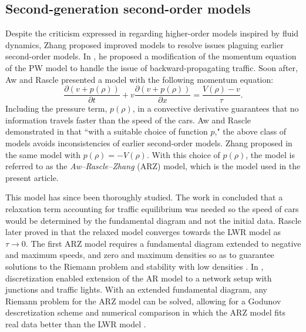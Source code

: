 \documentclass[preprint]{elsarticle}
\begin{document}
\subsection{Second-generation second-order models}
Despite the criticism expressed in \cite{Dag_requiem} regarding higher-order models inspired by fluid dynamics, Zhang proposed improved models to resolve issues plaguing earlier second-order models. In \cite{Zhang1998}, he proposed a modification of the momentum equation of the PW model to handle the issue of backward-propagating traffic.
Soon after, Aw and Rascle \cite{AR} presented a model with the following momentum equation:
\begin{equation}
\frac{\partial\left(v+p\left(\rho\right)\right)}{\partial t}+v\frac{\partial\left(v+p\left(\rho\right)\right)}{\partial x}=\frac{V(\rho)-v}{\tau}.
\end{equation}
Including the pressure term, $p(\rho)$, in a convective derivative guarantees that no information travels faster than the speed of the cars. Aw and Rascle demonstrated in \cite{AR} that ``with a suitable choice of function $p$," the above class of models avoids inconsistencies of earlier second-order models. Zhang proposed in \cite{Z} the same model with $p(\rho) = -V(\rho)$. With this choice of $p(\rho)$, the model is referred to as the \textit{Aw--Rascle--Zhang} (ARZ) model, which is the model used in the present article.

This model has since been thoroughly studied. The work in
\cite{AR} concluded that a relaxation term accounting for traffic
equilibrium was needed so the speed of cars would be determined by
the fundamental diagram and not the initial data. Rascle later proved in \cite{R_improved} that the relaxed model converges towards the LWR model as $\tau \rightarrow 0$. The first ARZ model requires a fundamental diagram extended to negative and maximum speeds, and zero and maximum densities so as to guarantee
solutions to the Riemann problem and stability with low densities \cite{Lebacque2007}. In \cite{HybridLagrangian2007}, 
discretization enabled extension of the AR model to a network setup with junctions and traffic lights. With an extended fundamental diagram, any Riemann problem for the ARZ model can be solved, allowing for a Godunov descretization scheme and numerical comparison
in which the ARZ model fits real data better than the LWR model \cite{GodunovARZ}.
\end{document}
